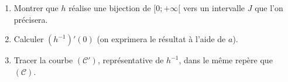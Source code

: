 \begin{exo}
\begin{description}
\begin{enumerate}
                              \begin{enumerate}
                                    \item Montrer que $h$ r\'ealise une bijection de $[0 ; +\infty[$
                                          vers un intervalle $J$ que l'on pr\'ecisera.
                                    \item Calculer $(h^{-1})'(0)$ (on exprimera le r\'esultat \`a l'aide de $a$).
                                    \item Tracer la courbe $(\mathscr{C}')$, repr\'esentative de $h^{-1}$,
                                          dans le m\^eme rep\`ere que $(\mathscr{C})$.
                              \end{enumerate}
                  \end{enumerate}
      \end{description}
\end{exo}
